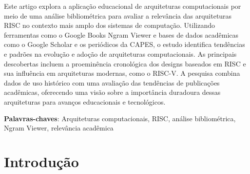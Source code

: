 \documentclass[
	article,			%
	11pt,				%
	oneside,			%
	a4paper,			%
	english,			%
	brazil,				%
	sumario=tradicional
	]{abntex2}
\begin{document}
\frenchspacing 


%
%
\maketitle
\begin{resumoumacoluna}
 Este artigo explora a aplicação educacional de arquiteturas computacionais por meio de uma análise bibliométrica para avaliar a relevância das arquiteturas RISC no contexto mais amplo dos sistemas de computação. Utilizando ferramentas como o Google Books Ngram Viewer e bases de dados acadêmicas como o Google Scholar e os periódicos da CAPES, o estudo identifica tendências e padrões na evolução e adoção de arquiteturas computacionais. As principais descobertas incluem a proeminência cronológica dos designs baseados em RISC e sua influência em arquiteturas modernas, como o RISC-V. A pesquisa combina dados de uso histórico com uma avaliação das tendências de publicações acadêmicas, oferecendo uma visão sobre a importância duradoura dessas arquiteturas para avanços educacionais e tecnológicos.
 
 \vspace{\onelineskip}
 
 \noindent
 \textbf{Palavras-chaves}: Arquiteturas computacionais, RISC, análise bibliométrica, Ngram Viewer, relevância acadêmica
\end{resumoumacoluna}


\textual

\section*{Introdução}
\end{document}
